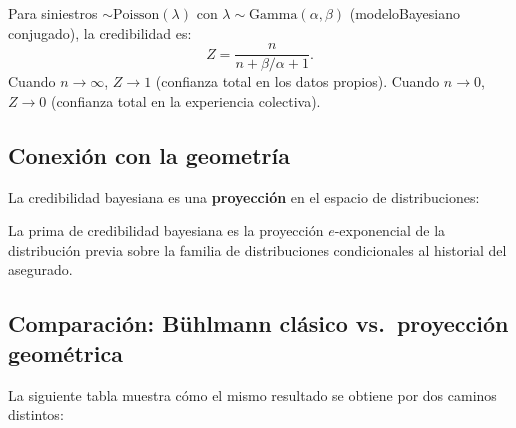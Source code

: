 \begin{example}
	Para siniestros $\sim \mathrm{Poisson}(\lambda)$ con $\lambda \sim \mathrm{Gamma}(\alpha, \beta)$ (modeloBayesiano conjugado), la credibilidad es:
	\[
	Z = \frac{n}{n + \beta/\alpha + 1}.
	\]
	Cuando $n \to \infty$, $Z \to 1$ (confianza total en los datos propios).  Cuando $n \to 0$, $Z \to 0$ (confianza total en la experiencia colectiva).
\end{example}

\begin{center}
\end{center}

\subsection{Conexión con la geometría}

La credibilidad bayesiana es una \textbf{proyección} en el espacio de distribuciones:

\begin{proposition}
	La prima de credibilidad bayesiana es la proyección $e$-exponencial de la distribución previa sobre la familia de distribuciones condicionales al historial del asegurado.
\end{proposition}

\subsection{Comparación: Bühlmann clásico vs.\ proyección geométrica}

La siguiente tabla muestra cómo el mismo resultado se obtiene por dos caminos distintos:

